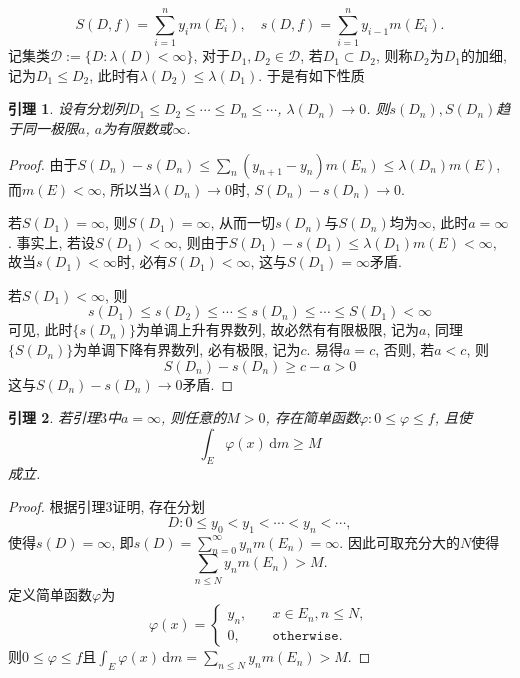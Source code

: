 \documentclass[12pt, a4paper, oneside]{ctexart}
\newtheorem{lemma}{引理}
\numberwithin{equation}{section}  %
\let\leq=\leqslant %
\let\geq=\geqslant %
\def\d{\mathrm{d}}          %
\begin{document}
\begin{equation*}
    S(D, f) = \sum_{i=1}^ny_im(E_i),\quad s(D, f) = \sum_{i=1}^ny_{i-1}m(E_i).
\end{equation*}
记集类$\mathcal{D} := \{D:\lambda(D) < \infty\}$, 对于$D_1, D_2\in \mathcal{D}$, 若$D_1\subset D_2$, 则称$D_2$为$D_1$的加细, 记为$D_1\leq D_2$, 此时有$\lambda(D_2)\leq \lambda(D_1)$. 于是有如下性质
\begin{lemma}
    设有分划列$D_1\leq D_2\leq \cdots \leq D_n\leq \cdots$, $\lambda(D_n)\to 0$. 则$s(D_n),S(D_n)$趋于同一极限$a$, $a$为有限数或$\infty$.
\end{lemma}
\begin{proof}
    由于$S(D_n) - s(D_n)\leq \sum_{n}(y_{n+1}-y_n)m(E_n)\leq \lambda(D_n)m(E)$, 而$m(E) < \infty$, 所以当$\lambda(D_n)\to 0$时, $S(D_n)-s(D_n)\to 0$.

    若$S(D_1)=\infty$, 则$S(D_1)=\infty$, 从而一切$s(D_n)$与$S(D_n)$均为$\infty$, 此时$a=\infty$. 事实上, 若设$S(D_1) < \infty$, 则由于$S(D_1)-s(D_1)\leq \lambda(D_1)m(E) < \infty$, 故当$s(D_1) < \infty$时, 必有$S(D_1) < \infty$, 这与$S(D_1)=\infty$矛盾.

    若$S(D_1) < \infty$, 则
    \begin{equation*}
        s(D_1)\leq s(D_2)\leq \cdots \leq s(D_n)\leq \cdots \leq S(D_1) < \infty
    \end{equation*}
    可见, 此时$\{s(D_n)\}$为单调上升有界数列, 故必然有有限极限, 记为$a$, 同理$\{S(D_n)\}$为单调下降有界数列, 必有极限, 记为$c$. 易得$a=c$, 否则, 若$a<c$, 则
    \begin{equation*}
        S(D_n)-s(D_n)\geq c-a >0
    \end{equation*}
    这与$S(D_n)-s(D_n)\to 0$矛盾.
\end{proof}
\begin{lemma}
    若引理$3$中$a=\infty$, 则任意的$M>0$, 存在简单函数$\varphi:0\leq \varphi\leq f$, 且使
    \begin{equation*}
        \int_E\varphi(x)\,\d m\geq M
    \end{equation*}
    成立.
\end{lemma}
\begin{proof}
    根据引理$3$证明, 存在分划\begin{equation*}
        D:0\leq y_0 < y_1 < \cdots < y_n < \cdots,
    \end{equation*}
    使得$s(D) = \infty$, 即$s(D) = \sum_{n=0}^\infty y_nm(E_n)=\infty$. 因此可取充分大的$N$使得
    \begin{equation*}
        \sum_{n\leq N}y_nm(E_n)>M.
    \end{equation*}
    定义简单函数$\varphi$为
    \begin{equation*}
        \varphi(x)=\begin{cases}
            y_n,&\quad x\in E_n,n\leq N,\\
            0,&\quad\mathtt{otherwise}.
        \end{cases}
    \end{equation*}
    则$0\leq \varphi\leq f$且$\int_E\varphi(x)\,\d m = \sum_{n\leq N}y_nm(E_n)>M$.
\end{proof}
\end{document}
